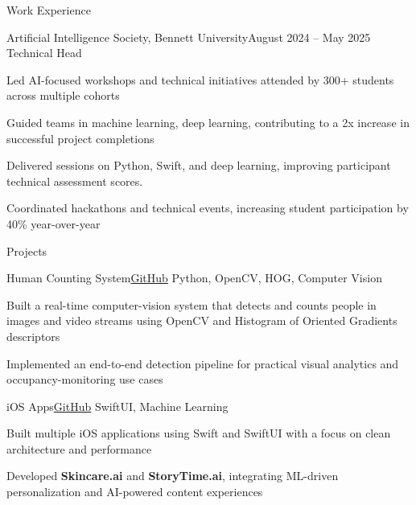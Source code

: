 \documentclass{resume}
\begin{document}
\begin{rSection}{Work Experience}
\begin{rSubsection}{Artificial Intelligence Society, Bennett University}{August 2024 -- May 2025}
{Technical Head}{}
\item Led AI-focused workshops and technical initiatives attended by 300+ students across multiple cohorts
\item Guided teams in machine learning, deep learning, contributing to a 2x increase in successful project completions
\item Delivered sessions on Python, Swift, and deep learning, improving participant technical assessment scores.
\item Coordinated hackathons and technical events, increasing student participation by 40\% year-over-year
\end{rSubsection}
\end{rSection}

\begin{rSection}{Projects}
\begin{rSubsection}{Human Counting System}{\href{https://github.com/aryansk/Human-Counting-System}{GitHub}}
{Python, OpenCV, HOG, Computer Vision}{}
\item Built a real-time computer-vision system that detects and counts people in images and video streams using OpenCV and Histogram of Oriented Gradients descriptors
\item Implemented an end-to-end detection pipeline for practical visual analytics and occupancy-monitoring use cases
\end{rSubsection}

\begin{rSubsection}{iOS Apps}{\href{https://github.com/aryansk}{GitHub}}
{SwiftUI, Machine Learning}{}
\item Built multiple iOS applications using Swift and SwiftUI with a focus on clean architecture and performance
\item Developed \textbf{Skincare.ai} and \textbf{StoryTime.ai}, integrating ML-driven personalization and AI-powered content experiences
\end{rSubsection}
\end{rSection}
\end{document}
